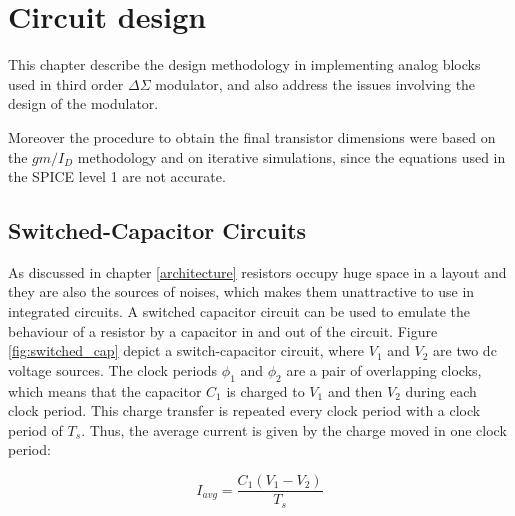 \chapter{Circuit design}
This chapter describe the design methodology in implementing analog blocks used in third order $\Delta\Sigma$ modulator, and also address the issues involving the design of the modulator. 

Moreover the procedure to obtain the final transistor dimensions were based on the $gm/I_D$ methodology and on iterative simulations, since the equations used in the SPICE level 1 are not accurate. 

\section{Switched-Capacitor Circuits}

As discussed in chapter \ref{architecture} resistors occupy huge space in a layout and they are also the sources of noises, which makes them unattractive to use in integrated circuits. A switched capacitor circuit can be used to emulate the behaviour of a resistor by a capacitor in and out of the circuit. Figure \ref{fig:switched_cap} depict a switch-capacitor circuit, where \textit{$V_1$} and \textit{$V_2$} are two dc voltage sources. The clock periods $\phi_1$ and $\phi_2$ are a pair of overlapping clocks, which means that the capacitor $C_1$ is charged to $V_1$ and then $V_2$ during each clock period. This charge transfer is repeated every clock period with a clock period of $T_s$. Thus, the average current is given by the charge moved in one clock period\cite{Johns}:  

\begin{equation}\label{sw_res}
    I_{avg} = \frac{C_1(V_1 - V_2)}{T_s}
\end{equation}

